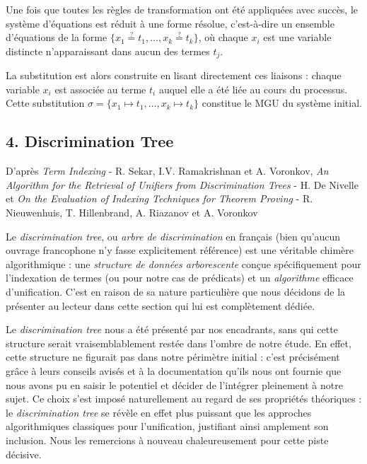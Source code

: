 \documentclass[11pt]{article}
\newenvironment{avantpropos}{%
    \begin{mdframed}[
        linecolor=sectioncolor!40,
        linewidth=0.8pt,
        backgroundcolor=sectioncolor!5,
        innerleftmargin=10pt,
        innerrightmargin=10pt,
        innertopmargin=6pt,
        innerbottommargin=6pt,
        skipabove=8pt,
        skipbelow=8pt
    ]
    \noindent\textbf{\small\color{sectioncolor}}\enspace\small\itshape
}{%
    \end{mdframed}
}
\begin{document}
\vspace{0.2cm}
Une fois que toutes les règles de transformation ont été appliquées avec succès, le système d'équations est réduit à une forme résolue, c'est-à-dire un ensemble d'équations de la forme $\{x_1 \overset{?}{=} t_1, \dots, x_k \overset{?}{=} t_k\}$, où chaque $x_i$ est une variable distincte n'apparaissant dans aucun des termes $t_j$.

La substitution est alors construite en lisant directement ces liaisons : chaque variable $x_i$ est associée au terme $t_i$ auquel elle a été liée au cours du processus. Cette substitution $\sigma = \{x_1 \mapsto t_1, \dots, x_k \mapsto t_k\}$ constitue le MGU du système initial.

\newpage
\subsection*{4. Discrimination Tree}
\label{discrimination_tree}

\begin{avantpropos}
    D'après \emph{Term Indexing} - R. Sekar, I.V. Ramakrishnan et A. Voronkov, \emph{An Algorithm for the Retrieval of Unifiers from
Discrimination Trees} - H. De Nivelle et \emph{On the Evaluation of Indexing Techniques for Theorem Proving} - R. Nieuwenhuis, T. Hillenbrand,
A. Riazanov et A. Voronkov
\end{avantpropos}

Le \textit{discrimination tree}, ou \textit{arbre de discrimination} en français (bien 
qu'aucun ouvrage francophone n'y fasse explicitement référence) est une véritable 
chimère algorithmique : une \textit{structure de données arborescente} conçue spécifiquement pour l'indexation de termes (ou pour notre cas de prédicats) et un \textit{algorithme} efficace d'unification. C'est en raison de sa nature particulière que nous décidons de la présenter au lecteur dans cette section qui lui est complètement dédiée.

\vspace{0.2cm}
Le \textit{discrimination tree} nous a été présenté par nos encadrants, sans qui cette structure serait vraisemblablement restée dans l'ombre de notre étude. En 
effet, cette structure ne figurait pas dans notre périmètre initial : c'est précisément 
grâce à leurs conseils avisés et à la documentation qu'ils nous ont fournie que nous avons 
pu en saisir le potentiel et décider de l'intégrer pleinement à notre sujet. Ce choix 
s'est imposé naturellement au regard de ses propriétés théoriques : le 
\textit{discrimination tree} se révèle en effet plus puissant que les approches 
algorithmiques classiques pour l'unification, justifiant ainsi amplement son inclusion. 
Nous les remercions à nouveau chaleureusement pour cette piste décisive.
\end{document}
